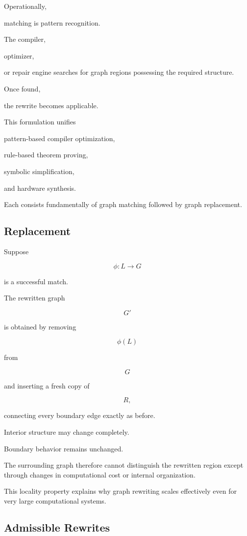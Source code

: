 \documentclass[12pt,oneside]{article}
\begin{document}
Operationally,

matching is pattern recognition.

The compiler,

optimizer,

or repair engine searches for graph regions possessing the required structure.

Once found,

the rewrite becomes applicable.

This formulation unifies

pattern-based compiler optimization,

rule-based theorem proving,

symbolic simplification,

and hardware synthesis.

Each consists fundamentally of graph matching followed by graph replacement.

\subsection{Replacement}

Suppose

\[
\phi
:
L
\rightarrow
G
\]

is a successful match.

The rewritten graph

\[
G'
\]

is obtained by removing

\[
\phi(L)
\]

from

\[
G
\]

and inserting a fresh copy of

\[
R,
\]

connecting every boundary edge exactly as before.

Interior structure may change completely.

Boundary behavior remains unchanged.

The surrounding graph therefore cannot distinguish the rewritten region except through changes in computational cost or internal organization.

This locality property explains why graph rewriting scales effectively even for very large computational systems.

\subsection{Admissible Rewrites}
\end{document}
